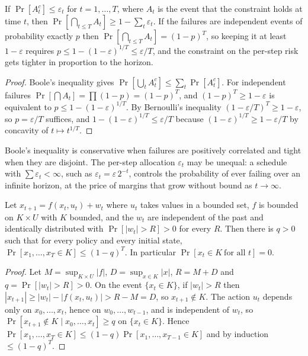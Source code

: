 \begin{newresult}\label{prop:boole}
If $\Pr[A_t^{c}]\le\varepsilon_t$ for $t=1,\dots,T$, where $A_t$ is the event that the constraint holds at time $t$, then $\Pr[\bigcap_{t\le T}A_t]\ge1-\sum_t\varepsilon_t$. If the failures are independent events of probability exactly $p$ then $\Pr[\bigcap_{t\le T}A_t]=(1-p)^T$, so keeping it at least $1-\varepsilon$ requires $p\le1-(1-\varepsilon)^{1/T}\le\varepsilon/T$, and the constraint on the per-step risk gets tighter in proportion to the horizon.
\end{newresult}
\begin{proof}
Boole's inequality gives $\Pr[\bigcup_tA_t^c]\le\sum_t\Pr[A_t^c]$. For independent failures $\Pr[\bigcap A_t]=\prod(1-p)=(1-p)^T$, and $(1-p)^T\ge1-\varepsilon$ is equivalent to $p\le1-(1-\varepsilon)^{1/T}$. By Bernoulli's inequality $(1-\varepsilon/T)^{T}\ge1-\varepsilon$, so $p=\varepsilon/T$ suffices, and $1-(1-\varepsilon)^{1/T}\le\varepsilon/T$ because $(1-\varepsilon)^{1/T}\ge1-\varepsilon/T$ by concavity of $t\mapsto t^{1/T}$.
\end{proof}

Boole's inequality is conservative when failures are positively correlated and tight when they are disjoint. The per-step allocation $\varepsilon_t$ may be unequal: a schedule with $\sum\varepsilon_t<\infty$, such as $\varepsilon_t=\varepsilon\,2^{-t}$, controls the probability of ever failing over an infinite horizon, at the price of margins that grow without bound as $t\to\infty$.

\begin{newresult}\label{prop:no-forever}
Let $x_{t+1}=f(x_t,u_t)+w_t$ where $u_t$ takes values in a bounded set, $f$ is bounded on $K\times U$ with $K$ bounded, and the $w_t$ are independent of the past and identically distributed with $\Pr[|w_t|>R]>0$ for every $R$. Then there is $q>0$ such that for every policy and every initial state, $\Pr[x_1,\dots,x_T\in K]\le(1-q)^{T}$. In particular $\Pr[x_t\in K\ \text{for all }t]=0$.
\end{newresult}
\begin{proof}
Let $M=\sup_{K\times U}|f|$, $D=\sup_{x\in K}|x|$, $R=M+D$ and $q=\Pr[|w_t|>R]>0$. On the event $\{x_t\in K\}$, if $|w_t|>R$ then $|x_{t+1}|\ge|w_t|-|f(x_t,u_t)|>R-M=D$, so $x_{t+1}\notin K$. The action $u_t$ depends only on $x_0,\dots,x_t$, hence on $w_0,\dots,w_{t-1}$, and is independent of $w_t$, so $\Pr[x_{t+1}\notin K\mid x_0,\dots,x_t]\ge q$ on $\{x_t\in K\}$. Hence $\Pr[x_1,\dots,x_{T}\in K]\le(1-q)\Pr[x_1,\dots,x_{T-1}\in K]$ and by induction $\le(1-q)^T$.
\end{proof}

